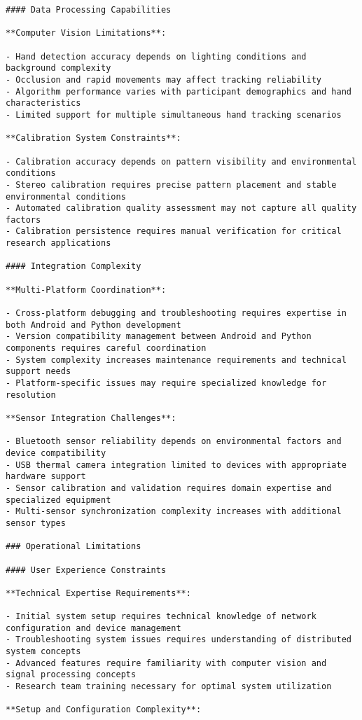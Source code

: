 \documentclass[12pt,a4paper]{report}
\begin{document}
\begin{verbatim}
#### Data Processing Capabilities

**Computer Vision Limitations**:

- Hand detection accuracy depends on lighting conditions and background complexity
- Occlusion and rapid movements may affect tracking reliability
- Algorithm performance varies with participant demographics and hand characteristics
- Limited support for multiple simultaneous hand tracking scenarios

**Calibration System Constraints**:

- Calibration accuracy depends on pattern visibility and environmental conditions
- Stereo calibration requires precise pattern placement and stable environmental conditions
- Automated calibration quality assessment may not capture all quality factors
- Calibration persistence requires manual verification for critical research applications

#### Integration Complexity

**Multi-Platform Coordination**:

- Cross-platform debugging and troubleshooting requires expertise in both Android and Python development
- Version compatibility management between Android and Python components requires careful coordination
- System complexity increases maintenance requirements and technical support needs
- Platform-specific issues may require specialized knowledge for resolution

**Sensor Integration Challenges**:

- Bluetooth sensor reliability depends on environmental factors and device compatibility
- USB thermal camera integration limited to devices with appropriate hardware support
- Sensor calibration and validation requires domain expertise and specialized equipment
- Multi-sensor synchronization complexity increases with additional sensor types

### Operational Limitations

#### User Experience Constraints

**Technical Expertise Requirements**:

- Initial system setup requires technical knowledge of network configuration and device management
- Troubleshooting system issues requires understanding of distributed system concepts
- Advanced features require familiarity with computer vision and signal processing concepts
- Research team training necessary for optimal system utilization

**Setup and Configuration Complexity**:


\end{verbatim}
\end{document}
